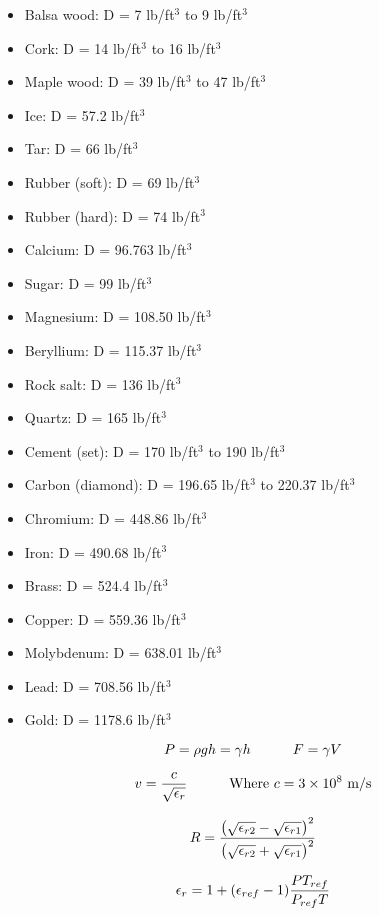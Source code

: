 \begin{itemize}
\item{} Balsa wood: D = 7 lb/ft$^{3}$ to 9 lb/ft$^{3}$
\item{} Cork: D = 14 lb/ft$^{3}$ to 16 lb/ft$^{3}$
\item{} Maple wood: D = 39 lb/ft$^{3}$ to 47 lb/ft$^{3}$
\item{} Ice: D = 57.2 lb/ft$^{3}$
\item{} Tar: D = 66 lb/ft$^{3}$
\item{} Rubber (soft): D = 69 lb/ft$^{3}$
\item{} Rubber (hard): D = 74 lb/ft$^{3}$
\item{} Calcium: D = 96.763 lb/ft$^{3}$
\item{} Sugar: D = 99 lb/ft$^{3}$
\item{} Magnesium: D = 108.50 lb/ft$^{3}$
\item{} Beryllium: D = 115.37 lb/ft$^{3}$
\item{} Rock salt: D = 136 lb/ft$^{3}$
\item{} Quartz: D = 165 lb/ft$^{3}$
\item{} Cement (set): D = 170 lb/ft$^{3}$ to 190 lb/ft$^{3}$ 
\item{} Carbon (diamond): D = 196.65 lb/ft$^{3}$ to 220.37 lb/ft$^{3}$
\item{} Chromium: D = 448.86 lb/ft$^{3}$
\item{} Iron: D = 490.68 lb/ft$^{3}$
\item{} Brass: D = 524.4 lb/ft$^{3}$
\item{} Copper: D = 559.36 lb/ft$^{3}$
\item{} Molybdenum: D = 638.01 lb/ft$^{3}$
\item{} Lead: D = 708.56 lb/ft$^{3}$
\item{} Gold: D = 1178.6 lb/ft$^{3}$
\end{itemize}

\vfil \eject

$$P = \rho g h = \gamma h \hskip 30pt F = \gamma V$$

\vskip 20pt

$$v = {c \over \sqrt{\epsilon_r}} \hskip 30pt \hbox{Where } c = 3 \times 10^8 \hbox{ m/s}$$

\vskip 20pt

$$R = {\left({\sqrt{\epsilon_{r2}} - \sqrt{\epsilon_{r1}}}\right)^2 \over \left(\sqrt{\epsilon_{r2}} + \sqrt{\epsilon_{r1}}\right)^2}$$

\vskip 20pt

$$\epsilon_r = 1 + (\epsilon_{ref} - 1) {P T_{ref} \over P_{ref} T}$$

